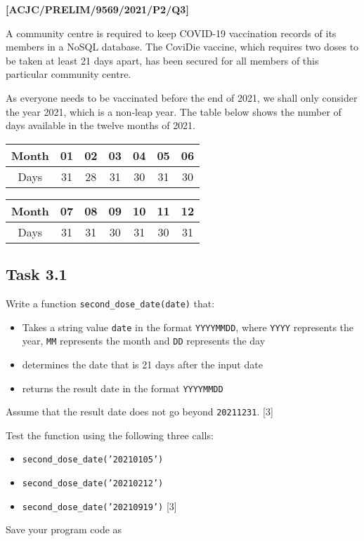 \item \textbf{{[}ACJC/PRELIM/9569/2021/P2/Q3{]} }

\noindent A community centre is required to keep COVID-19 vaccination
records of its members in a NoSQL database. The CoviDie vaccine, which
requires two doses to be taken at least 21 days apart, has been secured
for all members of this particular community centre. 

\noindent As everyone needs to be vaccinated before the end of 2021,
we shall only consider the year 2021, which is a non-leap year. The
table below shows the number of days available in the twelve months
of 2021.
\noindent \begin{center}
\begin{tabular}{|c|c|c|c|c|c|c|}
\hline 
Month  & 01  & 02  & 03  & 04  & 05  & 06\tabularnewline
\hline 
Days  & 31  & 28  & 31  & 30  & 31 & 30\tabularnewline
\hline 
\end{tabular}
\par\end{center}

\noindent \begin{center}
\begin{tabular}{|c|c|c|c|c|c|c|}
\hline 
Month  & 07  & 08  & 09 & 10  & 11  & 12\tabularnewline
\hline 
Days & 31 & 31 & 30 & 31 & 30 & 31\tabularnewline
\hline 
\end{tabular}
\par\end{center}

\subsection*{Task 3.1}

\noindent Write a function \texttt{second\_dose\_date(date)} that:
\begin{itemize}
\item Takes a string value \texttt{date} in the format \texttt{YYYYMMDD},
where \texttt{YYYY} represents the year, \texttt{MM} represents the
month and \texttt{DD} represents the day 
\item determines the date that is 21 days after the input date 
\item returns the result date in the format \texttt{YYYYMMDD}
\end{itemize}
\noindent Assume that the result date does not go beyond \texttt{20211231}.
\hfill{}{[}3{]}

\noindent Test the function using the following three calls:
\begin{itemize}
\item \texttt{second\_dose\_date('20210105') }
\item \texttt{second\_dose\_date('20210212') }
\item \texttt{second\_dose\_date('20210919')} \hfill{}{[}3{]}
\end{itemize}
\noindent Save your program code as

